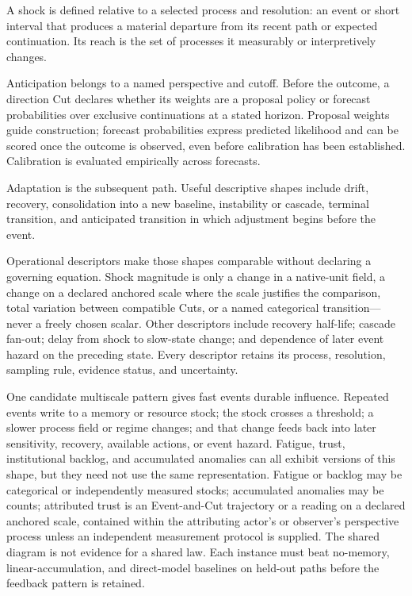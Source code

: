 \documentclass[10pt]{article}
\begin{document}
A shock is defined relative to a selected process and resolution: an event or
short interval that produces a material departure from its recent path or
expected continuation. Its reach is the set of processes it measurably or
interpretively changes.

Anticipation belongs to a named perspective and cutoff. Before the outcome, a
direction Cut declares whether its weights are a proposal policy or forecast
probabilities over exclusive continuations at a stated horizon. Proposal
weights guide construction; forecast probabilities express predicted
likelihood and can be scored once the outcome is observed, even before
calibration has been established. Calibration is evaluated empirically across
forecasts.

Adaptation is the subsequent path. Useful descriptive shapes
include drift, recovery, consolidation into a new baseline, instability or
cascade, terminal transition, and anticipated transition in which adjustment
begins before the event.

Operational descriptors make those shapes comparable without declaring a
governing equation. Shock magnitude is only a change in a native-unit field, a change on a declared
anchored scale where the scale justifies the comparison, total variation
between compatible Cuts, or a named categorical transition---never a freely
chosen scalar. Other descriptors include recovery
half-life; cascade fan-out; delay from shock to slow-state change;
and dependence of later event hazard on the preceding state. Every descriptor
retains its process, resolution, sampling rule, evidence status, and uncertainty.

One candidate multiscale pattern gives fast events durable influence. Repeated
events write to a memory or resource stock; the stock crosses a threshold; a
slower process field or regime changes; and that change feeds back into later
sensitivity, recovery, available actions, or event hazard. Fatigue, trust,
institutional backlog, and accumulated anomalies can all exhibit versions of
this shape, but they need not use the same representation. Fatigue or backlog
may be categorical or independently measured stocks; accumulated anomalies may
be counts; attributed trust is an Event-and-Cut trajectory or a reading on a declared
anchored scale, contained within the attributing actor's or observer's
perspective process unless an independent measurement protocol is supplied. The shared diagram is not
evidence for a shared law. Each instance
must beat no-memory, linear-accumulation, and direct-model baselines on held-out
paths before the feedback pattern is retained.
\end{document}
